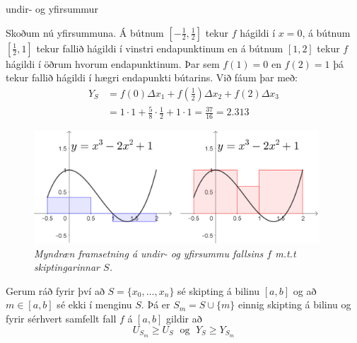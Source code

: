 \begin{syn}{undir- og yfirsummur}
\vspace{2mm}

Skoðum nú yfirsummuna. Á bútnum $\left[-\frac{1}{2},\frac{1}{2}\right]$ tekur $f$ hágildi í $x = 0$, á bútnum $\left[\frac{1}{2},1\right]$ tekur fallið hágildi í vinstri endapunktinum en á bútnum $\left[1,2\right]$ tekur $f$ hágildi í öðrum hvorum endapunktinum. Þar sem $f(1) = 0$ en $f(2) = 1$ þá tekur fallið hágildi í hægri endapunkti bútarins. Við fáum þar með:
\begin{align*}
Y_{S} &= f(0)\Delta x_{1} + f\left(\frac{1}{2}\right)\Delta x_{2} + f(2)\Delta x_{3}\\ &= 1\cdot1 + \frac{5}{8}\cdot\frac{1}{2} + 1\cdot1 = \frac{37}{16} = 2.313
\end{align*}

\begin{figure}[H]
\center
\includegraphics[width=0.95\textwidth]{Pictures/k2m9.png}
\caption{\it Myndræn framsetning á undir- og yfirsummu fallsins $f$ m.t.t skiptingarinnar $S$.}
\end{figure}

\end{syn}

\begin{hregla}{}
Gerum ráð fyrir því að $S = \{x_{0},\ldots,x_{n}\}$ sé skipting á bilinu $[a,b]$ og að $m \in [a,b]$ sé ekki í menginu $S$. Þá er $S_{m} = S \cup \{m\}$ einnig skipting á bilinu og fyrir sérhvert samfellt fall $f$ á $[a,b]$ gildir að
$$
U_{S_{m}} \geq U_{S} \; \text{ og } \; Y_{S} \geq Y_{S_{m}}
$$ 
\end{hregla}

